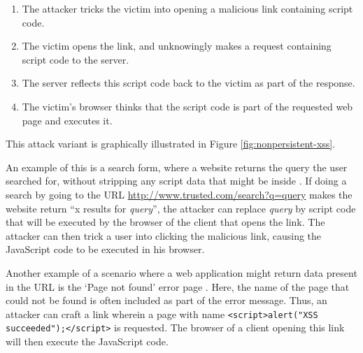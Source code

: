 \begin{enumerate}
	\item The attacker tricks the victim into opening a malicious link containing script code.
	\item The victim opens the link, and unknowingly makes a request containing script code to the server.
	\item The server reflects this script code back to the victim as part of the response.
	\item The victim's browser thinks that the script code is part of the requested web page and executes it.
\end{enumerate}

This attack variant is graphically illustrated in Figure \ref{fig:nonpersistent-xss}.

An example of this is a search form, where a website returns the query the user searched for, without stripping any script data that might be inside \cite{Vogt2007}. If doing a search by going to the URL \url{http://www.trusted.com/search?q=query} makes the website return ``x results for \emph{query}'', the attacker can replace \emph{query} by script code that will be executed by the browser of the client that opens the link. The attacker can then trick a user into clicking the malicious link, causing the JavaScript code to be executed in his browser.

Another example of a scenario where a web application might return data present in the URL is the `Page not found' error page \cite{Kirda2006}. Here, the name of the page that could not be found is often included as part of the error message. Thus, an attacker can craft a link wherein a page with name \texttt{<script>alert("XSS succeeded");</script>} is requested. The browser of a client opening this link will then execute the JavaScript code.

